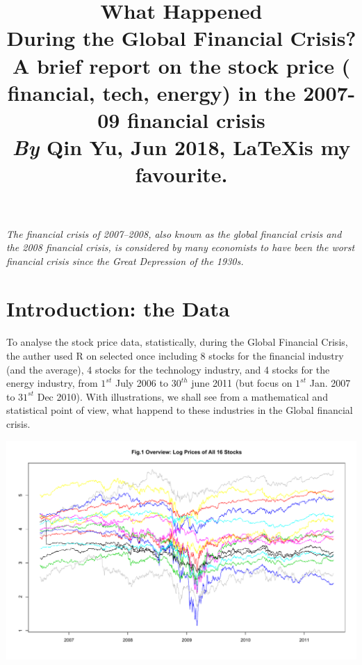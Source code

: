 \documentclass[11pt]{article}
\begin{document}
\title{
\vspace{-2em}
  \raggedright
  \textbf{What Happened \\During the Global Financial Crisis?} \\
  \vspace{0.3em}
  \large A brief report on the stock price ( financial, tech, energy) in the 2007-09 financial crisis \\
  \vspace{1em}
  \textit{By} \textbf{Qin Yu}, Jun 2018, \LaTeX is my favourite.
}
\date{}
\maketitle

\vspace{-5em}
\hspace{10em}
\parbox[position]{30em}{\textit{The financial crisis of 2007–2008, also known as the global financial crisis and the 2008 financial crisis, is considered by many economists to have been the worst financial crisis since the Great Depression of the 1930s.\cite{Wiki}}}

\section{Introduction: the Data}\vspace{-1em}
To analyse the stock price data, statistically, during the Global Financial Crisis, the auther used R on selected once including 8 stocks for the financial industry (and the average), 4 stocks for the technology industry, and 4 stocks for the energy industry, from $1^{st}$ July 2006 to $30^{th}$ june 2011 (but focus on $1^{st}$ Jan. 2007 to $31^{st}$ Dec 2010). With illustrations, we shall see from a mathematical and statistical point of view, what happend to these industries in the Global financial crisis.
\begin{center}
\includegraphics[width=1\linewidth]{graph/Fig1OverviewLogPricesOfAll16Stocks.pdf}
\end{center}
\end{document}
